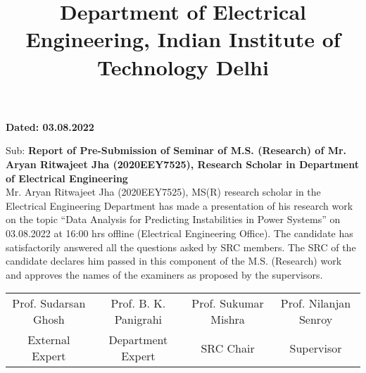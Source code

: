 \documentclass{article}
\begin{document}
	\title{\rmfamily\bfseries\normalsize Department of Electrical Engineering, Indian Institute of Technology Delhi}
	\date{}
	\maketitle
	
	\vspace{-8em}
	\begin{flushright}
		{\rmfamily\bfseries Dated: 03.08.2022} \\
	\end{flushright}
	
	\noindent
	Sub: {\rmfamily\bfseries Report of Pre-Submission of Seminar of M.S. (Research) of Mr. Aryan Ritwajeet Jha (2020EEY7525), Research Scholar in Department of Electrical Engineering}\\[15pt]
	
	\noindent
	Mr. Aryan Ritwajeet Jha (2020EEY7525), MS(R) research scholar in the Electrical Engineering Department has made a presentation of his research work on the topic ``Data Analysis for Predicting Instabilities in Power Systems'' on 03.08.2022 at 16:00 hrs offline (Electrical Engineering Office). The candidate has satisfactorily answered all the questions asked by SRC members. The SRC of the candidate declares him passed in this component of the M.S. (Research) work and approves the names of the examiners as proposed by the supervisors. \\
	
	\vspace{10em}
	
		\begin{table}[ht]
			\centering
			\hspace*{-5em}
			\begin{tabular}{cccc}
				Prof. Sudarsan Ghosh & Prof. B. K. Panigrahi & Prof. Sukumar Mishra & Prof. Nilanjan Senroy \\
				External Expert & Department Expert & SRC Chair & Supervisor
			\end{tabular}
		\end{table}
	
	
\end{document}
